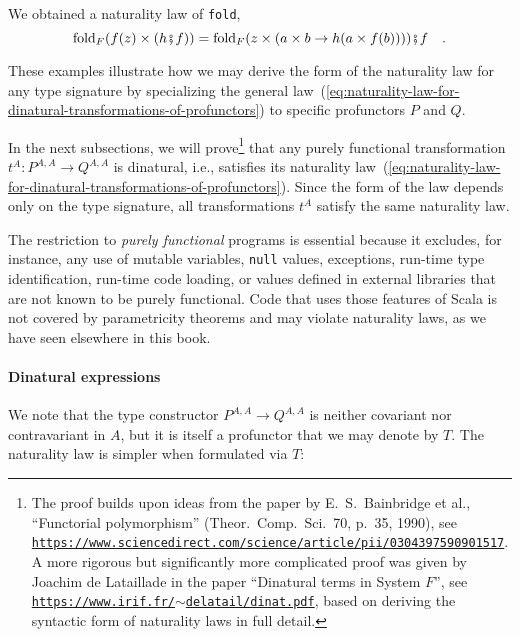 We obtained a naturality law of \lstinline!fold!,
\[
\text{fold}_{F}(f(z)\times(h\bef f))=\text{fold}_{F}(z\times(a\times b\rightarrow h(a\times f(b))))\bef f\quad.
\]

These examples illustrate how we may derive the form of the naturality
law for any type signature by specializing the general law~(\ref{eq:naturality-law-for-dinatural-transformations-of-profunctors})
to specific profunctors $P$ and $Q$.

In the next subsections, we will prove\footnote{The proof builds upon ideas from the paper by E.~S.~Bainbridge et
al., \textsf{``}Functorial polymorphism\textsf{''} (Theor.~Comp.~Sci.~70, p.~35,
1990), see \texttt{\href{https://www.sciencedirect.com/science/article/pii/0304397590901517}{https://www.sciencedirect.com/science/article/pii/0304397590901517}}.
A more rigorous but significantly more complicated proof was given
by Joachim de Lataillade in the paper
\textsf{``}Dinatural terms in System $F$\textsf{''}, see \texttt{\href{https://www.irif.fr/~delatail/dinat.pdf}{https://www.irif.fr/$\sim$delatail/dinat.pdf}},
based on deriving the syntactic form of naturality laws in full detail. } that any purely functional transformation $t^{A}:P^{A,A}\rightarrow Q^{A,A}$
is dinatural, i.e., satisfies its naturality law~(\ref{eq:naturality-law-for-dinatural-transformations-of-profunctors}).
Since the form of the law depends only on the type signature, all
transformations $t^{A}$ satisfy the same naturality law. 

The restriction to \emph{purely functional} programs
is essential because it excludes, for instance, any use of mutable
variables, \lstinline!null! values, exceptions, run-time type identification,
run-time code loading, or values defined in external libraries that
are not known to be purely functional. Code that uses those features
of Scala is not covered by parametricity theorems and may violate
naturality laws, as we have seen elsewhere in this book.

\paragraph{Dinatural expressions}

We note that the type constructor $P^{A,A}\rightarrow Q^{A,A}$ is
neither covariant nor contravariant in $A$, but it is itself a profunctor
that we may denote by $T$. The naturality law is simpler when formulated
via $T$:

